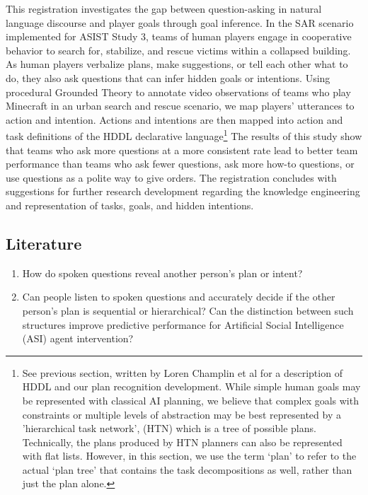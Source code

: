This registration investigates the gap between question-asking in natural language discourse and player goals through goal inference. In the SAR scenario implemented for ASIST Study 3, teams of human players engage in cooperative behavior to search for, stabilize, and rescue victims within a collapsed building. As human players verbalize plans, make suggestions, or tell each other what to do, they also ask questions that can infer hidden goals or intentions. Using procedural Grounded Theory to annotate video observations of teams who play Minecraft in an urban search and rescue scenario, we map players' utterances to action and intention. Actions and intentions are then mapped into action and task definitions of the HDDL declarative language\footnote{See previous section, written by Loren Champlin et al for a description of HDDL and our plan recognition development. While simple human goals may be represented with classical AI planning, we believe that complex goals with constraints or multiple levels of abstraction may be best represented by a 'hierarchical task network', (HTN) which is a tree of possible plans. Technically, the plans produced by HTN planners can also be represented with flat lists. However, in this section, we use the term `plan' to refer to the actual `plan tree' that contains the task decompositions as well, rather than just the plan alone.} The results of this study show that teams who ask more questions at a more consistent rate lead to better team performance than teams who ask fewer questions, ask more how-to questions, or use questions as a polite way to give orders. The registration concludes with suggestions for further research development regarding the knowledge engineering and representation of tasks, goals, and hidden intentions. 

\subsection{Literature}

\begin{enumerate}
    \item How do spoken questions reveal another person's plan or intent? 
    \item Can people listen to spoken questions and accurately decide if the other person's plan is sequential or hierarchical? Can the distinction between such structures improve predictive performance for Artificial Social Intelligence (ASI) agent intervention?
\end{enumerate}

